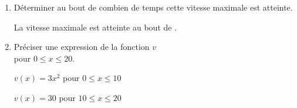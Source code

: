 \begin{corrige}
\begin{enumerate}
        {\red La vitesse maximale est de .}
        \item Déterminer au bout de combien de temps cette vitesse maximale est atteinte.
        
        {\red La vitesse maximale est atteinte au bout de .}
        \item Préciser une expression de la fonction $v$\\pour $0 \leq x \leq 20$.
        
        {\red $v(x)=3x^2$ pour $0 \leq x \leq 10$
        
        $v(x)=30$ pour $10 \leq x \leq 20$}
    \end{enumerate}
\end{corrige}
